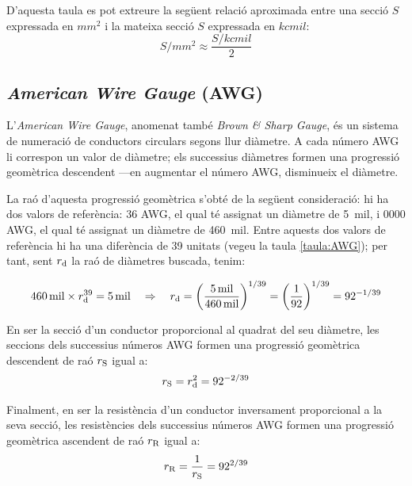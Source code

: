 D'aquesta taula es pot extreure la següent relació aproximada entre una secció $S$ expressada en $\unit{mm^2}$ i la mateixa secció $S$ expressada en $\unit{kcmil}$:
\begin{equation}
  S/{\scriptstyle\unit{mm^2}} \approx \frac{ S/{\scriptstyle\unit{kcmil}}}{2}
\end{equation}



\subsection{\textit{American Wire Gauge} (AWG)}\label{sec:awg}

L'\textit{American Wire Gauge}, anomenat també \textit{Brown \& Sharp Gauge}, és un sistema de numeració de conductors circulars segons llur diàmetre. A cada número AWG li correspon un valor de diàmetre; els successius diàmetres formen una progressió geomètrica descendent ---en augmentar el número AWG, disminueix el diàmetre.

La raó d'aquesta progressió geomètrica s'obté de la següent consideració: hi ha dos valors de referència: 36 AWG, el qual té assignat un diàmetre de \qty{5}{mil}, i 0000 AWG, el qual té assignat un diàmetre de \qty{460}{mil}. Entre aquests dos valors de referència hi ha una diferència de 39 unitats (vegeu la taula \vref{taula:AWG}); per tant, sent $r_\mathrm{d}$ la raó de diàmetres buscada, tenim:

\begin{equation}
   \qty{460}{mil} \times r_\mathrm{d}^{39} = \qty{5}{mil} \quad \Rightarrow \quad r_\mathrm{d} = \left( \frac{\qty{5}{mil}}{\qty{460}{mil}} \right)^{1/39} = \left( \frac{1}{92} \right)^{1/39} = 92^{-1/39}
\end{equation}

En ser la secció d'un conductor proporcional al quadrat del seu diàmetre, les seccions dels successius números AWG formen una progressió geomètrica  descendent de raó $r_\mathrm{S}$ igual a: \begin{equation}
   r_\mathrm{S} = r_\mathrm{d}^2 = 92^{-2/39}
\end{equation}

Finalment, en ser la resistència d'un conductor inversament proporcional a la seva secció, les resistències dels successius números AWG formen una progressió geomètrica ascendent de raó $r_\mathrm{R}$ igual a:
\begin{equation}
   r_\mathrm{R} = \frac{1}{r_\mathrm{S}} = 92^{2/39}
\end{equation}

